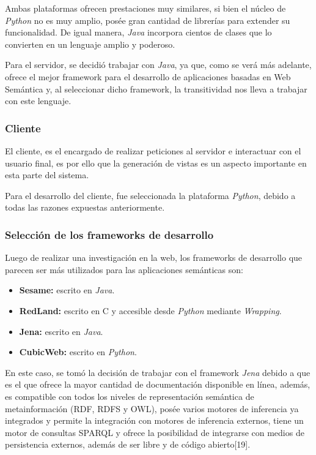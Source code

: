 Ambas plataformas ofrecen prestaciones muy similares, si bien el núcleo de \textit{Python} no es muy amplio, posée gran cantidad de librerías para extender su funcionalidad. De igual manera, \textit{Java} incorpora cientos de clases que lo convierten en un lenguaje amplio y poderoso.

Para el servidor, se decidió trabajar con \textit{Java}, ya que, como se verá más adelante, ofrece el mejor framework para el desarrollo de aplicaciones basadas en Web Semántica y, al seleccionar dicho framework, la transitividad nos lleva a trabajar con este lenguaje.

\subsubsection{Cliente}
El cliente, es el encargado de realizar peticiones al servidor e interactuar con el usuario final, es por ello que la generación de vistas es un aspecto importante en esta parte del sistema.

Para el desarrollo del cliente, fue seleccionada la plataforma \textit{Python}, debido a todas las razones expuestas anteriormente.

\subsubsection{Selección de los frameworks de desarrollo}
Luego de realizar una investigación en la web, los frameworks de desarrollo que parecen ser más utilizados para las aplicaciones semánticas son:

\begin{itemize}
    \item \textbf{Sesame:} escrito en \textit{Java}.
    \item \textbf{RedLand:} escrito en C y accesible desde \textit{Python} mediante \textit{Wrapping}.
    \item \textbf{Jena:} escrito en \textit{Java}.
    \item \textbf{CubicWeb:} escrito en \textit{Python}.
\end{itemize}

En este caso, se tomó la decisión de trabajar con el framework \textit{Jena} debido a que es el que ofrece la mayor cantidad de documentación disponible en línea, además, es compatible con todos los niveles de representación semántica de metainformación (RDF, RDFS y OWL), posée varios motores de inferencia ya integrados y permite la integración con motores de inferencia externos, tiene un motor de consultas SPARQL y ofrece la posibilidad de integrarse con medios de persistencia externos, además de ser libre y de código abierto[19].

